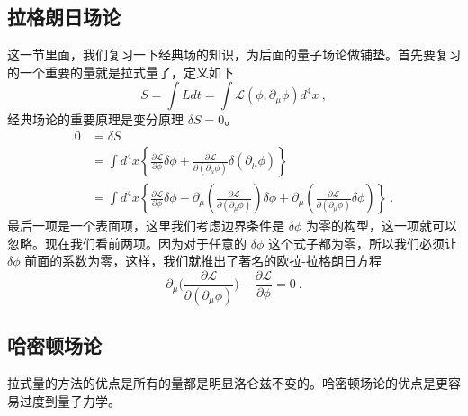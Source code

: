 


\subsection{拉格朗日场论}
这一节里面，我们复习一下经典场的知识，为后面的量子场论做铺垫。首先要复习的一个重要的量就是拉式量了，定义如下
\begin{equation}
S = \int L dt = \int \mathcal L(\phi,\partial_\mu \phi)d^4 x~,
\end{equation}
经典场论的重要原理是变分原理 $\delta S = 0$。
\begin{equation}
\begin{aligned}
0 &=\delta S \\
&=\int d^{4} x\left\{\frac{\partial \mathcal{L}}{\partial \phi} \delta \phi+\frac{\partial \mathcal{L}}{\partial\left(\partial_{\mu} \phi\right)} \delta\left(\partial_{\mu} \phi\right)\right\} \\
&=\int d^{4} x\left\{\frac{\partial \mathcal{L}}{\partial \phi} \delta \phi-\partial_{\mu}\left(\frac{\partial \mathcal{L}}{\partial\left(\partial_{\mu} \phi\right)}\right) \delta \phi+\partial_{\mu}\left(\frac{\partial \mathcal{L}}{\partial\left(\partial_{\mu} \phi\right)} \delta \phi\right)\right\}~.
\end{aligned}
\end{equation} 
最后一项是一个表面项，这里我们考虑边界条件是 $\delta \phi$ 为零的构型，这一项就可以忽略。现在我们看前两项。因为对于任意的 $\delta \phi$ 这个式子都为零，所以我们必须让 $\delta \phi$ 前面的系数为零，这样，我们就推出了著名的欧拉-拉格朗日方程
\begin{equation}
\partial_\mu \bigg( \frac{\partial \mathcal L}{\partial(\partial_\mu\phi)} \bigg) - \frac{\partial \mathcal L}{\partial \phi} = 0 ~.
\end{equation}

\subsection{哈密顿场论}
拉式量的方法的优点是所有的量都是明显洛仑兹不变的。哈密顿场论的优点是更容易过度到量子力学。

